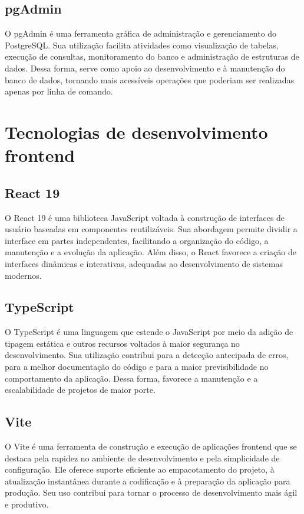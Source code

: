 \documentclass[grad,pdftex]{poli}
\begin{document}
\subsection{pgAdmin}

O pgAdmin é uma ferramenta gráfica de administração e gerenciamento do PostgreSQL. Sua utilização facilita atividades como visualização de tabelas, execução de consultas, monitoramento do banco e administração de estruturas de dados. Dessa forma, serve como apoio ao desenvolvimento e à manutenção do banco de dados, tornando mais acessíveis operações que poderiam ser realizadas apenas por linha de comando.

\section{Tecnologias de desenvolvimento frontend}

\subsection{React 19}

O React 19 é uma biblioteca JavaScript voltada à construção de interfaces de usuário baseadas em componentes reutilizáveis. Sua abordagem permite dividir a interface em partes independentes, facilitando a organização do código, a manutenção e a evolução da aplicação. Além disso, o React favorece a criação de interfaces dinâmicas e interativas, adequadas ao desenvolvimento de sistemas modernos.

\subsection{TypeScript}

O TypeScript é uma linguagem que estende o JavaScript por meio da adição de tipagem estática e outros recursos voltados à maior segurança no desenvolvimento. Sua utilização contribui para a detecção antecipada de erros, para a melhor documentação do código e para a maior previsibilidade no comportamento da aplicação. Dessa forma, favorece a manutenção e a escalabilidade de projetos de maior porte.

\subsection{Vite}

O Vite é uma ferramenta de construção e execução de aplicações frontend que se destaca pela rapidez no ambiente de desenvolvimento e pela simplicidade de configuração. Ele oferece suporte eficiente ao empacotamento do projeto, à atualização instantânea durante a codificação e à preparação da aplicação para produção. Seu uso contribui para tornar o processo de desenvolvimento mais ágil e produtivo.
\end{document}
